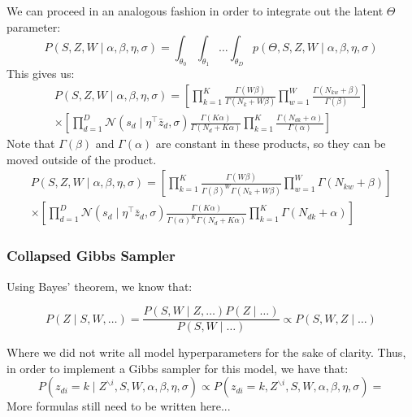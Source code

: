 \documentclass[a4paper,10pt]{article}
\begin{document}
We can proceed in an analogous fashion in order to integrate out the latent $\Theta$ parameter:
\begin{equation}
P(S, Z, W \mid \alpha, \beta, \eta, \sigma) = \int_{\theta_0}\int_{\theta_1}\dots \int_{\theta_D} p(\Theta, S, Z, W \mid \alpha, \beta, \eta, \sigma)
\end{equation}
This gives us:
\begin{equation}
\begin{gathered}
P(S, Z, W \mid \alpha, \beta, \eta, \sigma) =  \left[ \prod_{k = 1}^K \frac{ \Gamma(W\beta)}{\Gamma(N_k + W\beta)} \prod_{w = 1}^W \frac{\Gamma(N_{kw}+\beta)}{\Gamma(\beta)}\right]  \\
\times\left[ \prod_{d = 1}^D \mathcal{N}(s_d \mid \eta^\top \bar{z}_d, \sigma) \frac{\Gamma(K\alpha)}{\Gamma(N_d + K \alpha)} \prod_{k = 1}^K \frac{\Gamma(N_{dk} + \alpha)}{\Gamma(\alpha)} \right]
\end{gathered}
\end{equation}
Note that $\Gamma(\beta)$ and $\Gamma(\alpha)$ are constant in these products, so they can be moved outside of the product.
\begin{equation}
\begin{gathered}
P(S, Z, W \mid \alpha, \beta, \eta, \sigma) = \left[ \prod_{k = 1}^K \frac{ \Gamma(W\beta)}{\Gamma(\beta)^W \Gamma(N_k + W\beta)} \prod_{w = 1}^W \Gamma(N_{kw}+\beta)\right]\\
\times\left[ \prod_{d = 1}^D \mathcal{N}(s_d \mid \eta^\top \bar{z}_d, \sigma) \frac{\Gamma(K\alpha)}{\Gamma(\alpha)^K \Gamma(N_d + K \alpha)} \prod_{k = 1}^K \Gamma(N_{dk} + \alpha) \right]
\end{gathered}
\end{equation}

\subsubsection{Collapsed Gibbs Sampler}

Using Bayes' theorem, we know that:

\begin{equation}
P(Z \mid S, W, \dots) = \frac{P(S, W \mid Z, \dots) P(Z \mid \dots)}{P(S, W \mid \dots)} \propto P(S, W, Z \mid \dots)
\end{equation}

Where we did not write all model hyperparameters for the sake of clarity.
Thus, in order to implement a Gibbs sampler for this model, we have that:
\[P(z_{di} = k \mid Z^{\backslash{i}}, S, W, \alpha, \beta, \eta, \sigma) \propto P(z_{di} = k, Z^{\backslash{i}}, S, W, \alpha, \beta, \eta, \sigma) = \]
More formulas still need to be written here... %
\end{document}
